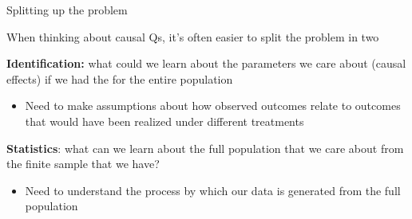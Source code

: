 \documentclass[11pt,english,handout]{beamer}
\newenvironment{wideitemize}{\itemize\addtolength{\itemsep}{10pt}}{\enditemize}
\begin{document}
\begin{frame}{Splitting up the problem}
	\begin{wideitemize}
		
		\item
		When thinking about causal Qs, it's often easier to split the problem in two
		
		\item
		\textbf{Identification:} what could we learn about the parameters we care about (causal effects) if we had the  for the entire population
		\begin{itemize}
			\item 
			Need to make assumptions about how observed outcomes relate to outcomes that would have been realized under different treatments
		\end{itemize}
		
		\item
		\textbf{Statistics}: what can we learn about the full population that we care about from the finite sample that we have?
			\begin{itemize}
				\item 
				Need to understand the process by which our data is generated from the full population
			\end{itemize} 	
		
	\end{wideitemize}	
	
\end{frame}
\end{document}
